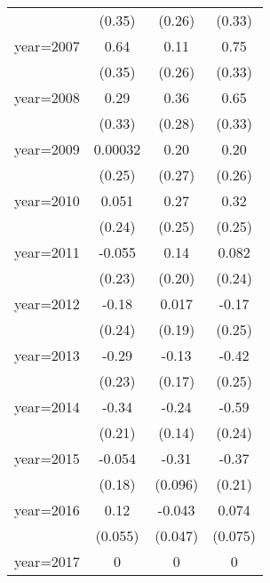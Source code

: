\begin{table}[htbp]
\begin{tabular}{l*{3}{c}}
                &   (0.35)         &   (0.26)         &   (0.33)         \\
\addlinespace
year=2007       &     0.64         &     0.11         &     0.75\sym{*}  \\
                &   (0.35)         &   (0.26)         &   (0.33)         \\
\addlinespace
year=2008       &     0.29         &     0.36         &     0.65         \\
                &   (0.33)         &   (0.28)         &   (0.33)         \\
\addlinespace
year=2009       &  0.00032         &     0.20         &     0.20         \\
                &   (0.25)         &   (0.27)         &   (0.26)         \\
\addlinespace
year=2010       &    0.051         &     0.27         &     0.32         \\
                &   (0.24)         &   (0.25)         &   (0.25)         \\
\addlinespace
year=2011       &   -0.055         &     0.14         &    0.082         \\
                &   (0.23)         &   (0.20)         &   (0.24)         \\
\addlinespace
year=2012       &    -0.18         &    0.017         &    -0.17         \\
                &   (0.24)         &   (0.19)         &   (0.25)         \\
\addlinespace
year=2013       &    -0.29         &    -0.13         &    -0.42         \\
                &   (0.23)         &   (0.17)         &   (0.25)         \\
\addlinespace
year=2014       &    -0.34         &    -0.24         &    -0.59\sym{*}  \\
                &   (0.21)         &   (0.14)         &   (0.24)         \\
\addlinespace
year=2015       &   -0.054         &    -0.31\sym{**} &    -0.37         \\
                &   (0.18)         &  (0.096)         &   (0.21)         \\
\addlinespace
year=2016       &     0.12\sym{*}  &   -0.043         &    0.074         \\
                &  (0.055)         &  (0.047)         &  (0.075)         \\
\addlinespace
year=2017       &        0         &        0         &        0         \\

\end{tabular}
\end{table}
